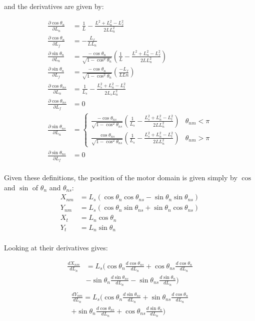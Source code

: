 \documentclass[11pt,twocolumn]{article}
\begin{document}
and the derivatives are given by:

\begin{align}
  \frac{\partial \cos\theta_n}{\partial L_n} &= \frac{1}{L} - \frac{L^2 + L_n^2 - L_f^2}{2L L_n^2}\\
  \frac{\partial \cos\theta_n}{\partial L_f} &= -\frac{L_f}{LL_n}\\
  \frac{\partial \sin\theta_n}{\partial L_n} &= \frac{-\cos\theta_n}{\sqrt{1-\cos^2\theta_n}}
  \left(\frac{1}{L} - \frac{L^2 + L_n^2 - L_f^2}{2L L_n^2}\right)\\
  \frac{\partial \sin\theta_n}{\partial L_f} &= \frac{-\cos\theta_n}{\sqrt{1-\cos^2\theta_n}}
  \left(\frac{-L_f}{LLn}\right)\\
  \frac{\partial \cos\theta_{ns}}{\partial L_n} &= \frac{1}{L_s}
  - \frac{L_s^2 + L_n^2 - L_t^2}{2L_sL_n^2}\\
  \frac{\partial \cos\theta_{ns}}{\partial L_f} &= 0\\
  \frac{\partial \sin\theta_{ns}}{\partial L_n} &=
  \begin{cases}
    \frac{-\cos\theta_{ns}}{\sqrt{1-\cos^2\theta_{ns}}}
    \left(\frac{1}{L_s} - \frac{L_s^2+L_n^2-L_t^2}{2LL_n^2}\right) & \theta_{nm} < \pi \\
    \frac{\cos\theta_{ns}}{\sqrt{1-\cos^2\theta_{ns}}}
    \left(\frac{1}{L_s} - \frac{L_s^2+L_n^2-L_t^2}{2LL_n^2}\right) & \theta_{nm} > \pi
  \end{cases}\\
  \frac{\partial \sin\theta_{ns}}{\partial L_f} &= 0\\
\end{align}

Given these definitions, the position of the motor domain is given
simply by $\cos$ and $\sin$ of $\theta_n$ and $\theta_{ns}$:
\begin{align}
  X_{nm} &= L_s\left(
  \cos\theta_n\cos\theta_{ns} - \sin\theta_n\sin\theta_{ns}
  \right)
  \\
  Y_{nm} &= L_s\left(
  \cos\theta_n\sin\theta_{ns} + \sin\theta_n\cos\theta_{ns}
  \right)
  \\
  X_{t} &= L_n\cos\theta_n\\
  Y_{t} &= L_n\sin\theta_n\\
\end{align}

Looking at their derivatives gives:

\begin{align}
  \frac{dX_{nm}}{dL_n} &= L_s\Big(
  \cos\theta_n\frac{d\cos\theta_{ns}}{dL_n}
  + \cos\theta_{ns}\frac{d\cos\theta_{n}}{dL_n} \\
  &- \sin\theta_n\frac{d\sin\theta_{ns}}{dL_n}
  - \sin\theta_{ns}\frac{d\sin\theta_{n}}{dL_n}
  \Big)\\
\end{align}
\begin{multline}
  \frac{dY_{nm}}{dL_n} = L_s\Big(
  \cos\theta_n\frac{d\sin\theta_{ns}}{dL_n}
  + \sin\theta_{ns}\frac{d\cos\theta_{n}}{dL_n} \\
  + \sin\theta_n\frac{d\cos\theta_{ns}}{dL_n}
  + \cos\theta_{ns}\frac{d\sin\theta_{n}}{dL_n}
  \Big)
\end{multline}
\end{document}
